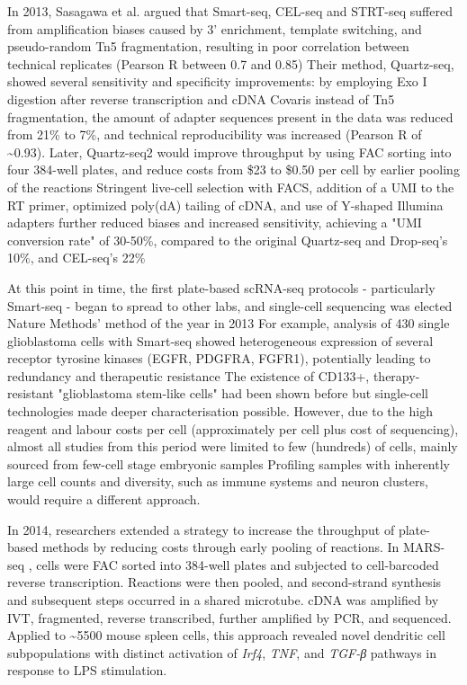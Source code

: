 In 2013, Sasagawa et al. argued that Smart-seq, CEL-seq and STRT-seq suffered from amplification biases caused by 3' enrichment, template switching, and pseudo-random Tn5 fragmentation, resulting in poor correlation between technical replicates (Pearson R between 0.7 and 0.85) Their method, Quartz-seq, showed several sensitivity and specificity improvements: by employing Exo I digestion after reverse transcription and cDNA Covaris instead of Tn5 fragmentation, the amount of adapter sequences present in the data was reduced from 21\% to 7\%, and technical reproducibility was increased (Pearson R of \textasciitilde{0.93}). Later, Quartz-seq2 would improve throughput by using FAC sorting into four 384-well plates, and reduce costs from \$23 to \$0.50 per cell by earlier pooling of the reactions Stringent live-cell selection with FACS, addition of a UMI to the RT primer, optimized poly(dA) tailing of cDNA, and use of Y-shaped Illumina adapters further reduced biases and increased sensitivity, achieving a "UMI conversion rate" of 30-50\%, compared to the original Quartz-seq and Drop-seq's 10\%, and CEL-seq's 22\%

At this point in time, the first plate-based scRNA-seq protocols - particularly Smart-seq - began to spread to other labs, and single-cell sequencing was elected Nature Methods' method of the year in 2013 For example, analysis of \num{430} single glioblastoma cells with Smart-seq showed heterogeneous expression of several receptor tyrosine kinases (EGFR, PDGFRA, FGFR1), potentially leading to redundancy and therapeutic resistance The existence of CD133+, therapy-resistant "glioblastoma stem-like cells" had been shown before but single-cell technologies made deeper characterisation possible. However, due to the high reagent and labour costs per cell (approximately  per cell plus cost of sequencing), almost all studies from this period were limited to few (hundreds) of cells, mainly sourced from few-cell stage embryonic samples Profiling samples with inherently large cell counts and diversity, such as immune systems and neuron clusters, would require a different approach.

In 2014, researchers extended a strategy to increase the throughput of plate-based methods by reducing costs through early pooling of reactions. In MARS-seq , cells were FAC sorted into 384-well plates and subjected to cell-barcoded reverse transcription. Reactions were then pooled, and second-strand synthesis and subsequent steps occurred in a shared microtube. cDNA was amplified by IVT, fragmented, reverse transcribed, further amplified by PCR, and sequenced. Applied to \textasciitilde{\num{5500}} mouse spleen cells, this approach revealed novel dendritic cell subpopulations with distinct activation of \textit{Irf4}, \textit{TNF}, and \textit{TGF-{\greekfont β}} pathways in response to LPS stimulation.

